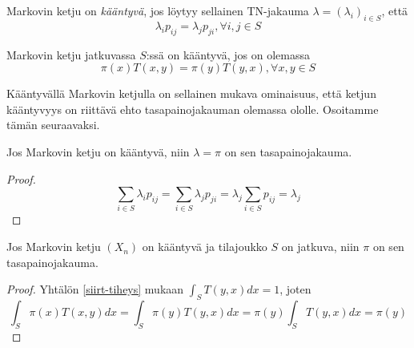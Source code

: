 \begin{maar}\label{kaant-disk}
	Markovin ketju on \textit{kääntyvä}, jos löytyy sellainen TN-jakauma $\lambda=(\lambda_i)_{i\in S}$, että 
	\begin{equation}
		\lambda_ip_{ij}= \lambda_jp_{ji},\forall i,j\in S
	\end{equation}
\end{maar}

\begin{maar}\label{kaant-jatk}
	Markovin ketju jatkuvassa $S$:ssä on kääntyvä, jos on olemassa 
	\begin{equation}
		\pi(x)T(x,y)=\pi(y)T(y,x), \forall x,y\in S
	\end{equation}
\end{maar}

Kääntyvällä Markovin ketjulla on sellainen mukava ominaisuus, että ketjun kääntyvyys on riittävä ehto tasapainojakauman olemassa ololle. Osoitamme tämän seuraavaksi.

\begin{lause}
	Jos Markovin ketju on kääntyvä, niin $\lambda=\pi$ on sen tasapainojakauma.
\end{lause}
\begin{proof}
	\begin{equation*}
		\sum_{i\in S} \lambda_i p_{ij} = \sum_{i\in S} \lambda_j p_{ji} = \lambda_j \sum_{i\in S} p_{ij} = \lambda_j
	\end{equation*}
\end{proof}

\begin{lause}
	Jos Markovin ketju $(X_n)$ on kääntyvä ja tilajoukko $S$ on jatkuva, niin $\pi$ on sen tasapainojakauma.
\end{lause}

\begin{proof}
	Yhtälön \ref{siirt-tiheys} mukaan $\int_S T(y,x)dx = 1$, joten
	\begin{equation}
		\int_S \pi(x) T(x,y) dx = \int_S \pi(y) T(y,x) dx = \pi(y)\int_S T(y,x) dx = \pi(y)
	\end{equation}
\end{proof}

